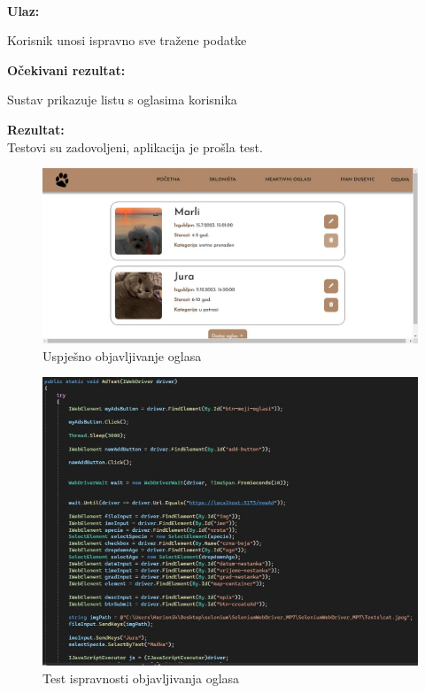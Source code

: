 			\noindent {}\\
			\textbf{Ulaz: }	
			\begin{packed_enum}
				\item Korisnik unosi ispravno sve tražene podatke
				
			\end{packed_enum}
			
			\noindent \textbf{Očekivani rezultat:}
			
			\begin{packed_enum}
				\item Sustav prikazuje listu s oglasima korisnika
				
			\end{packed_enum}
			
			\noindent \textbf{Rezultat:}\\
			Testovi su zadovoljeni, aplikacija je prošla test.\\
			\begin{figure}[H]
				\includegraphics[width=\textwidth]{uspjesno_objavljivanje_oglasa.JPEG}
				\centering
				\caption{Uspješno objavljivanje oglasa}
				\label{fig:uspjesnoobjavljivanjeoglasa}
			\end{figure}
			\begin{figure}[H]
				\includegraphics[width=\textwidth]{2test_postad_1.JPEG}
				\centering
				\caption{Test ispravnosti objavljivanja oglasa}
				\label{fig:testpostad1}
			\end{figure}
